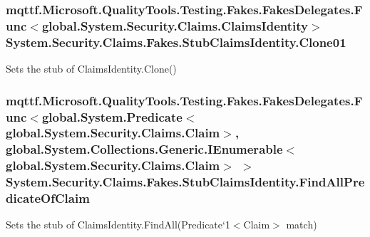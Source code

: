 \hypertarget{class_system_1_1_security_1_1_claims_1_1_fakes_1_1_stub_claims_identity_a72a889d3f2dfdd1b5397b5fe3dfcedfa}{
\subsubsection[{Clone01}]{\setlength{\rightskip}{0pt plus 5cm}mqttf.\-Microsoft.\-Quality\-Tools.\-Testing.\-Fakes.\-Fakes\-Delegates.\-Func$<$global.\-System.\-Security.\-Claims.\-Claims\-Identity$>$ System.\-Security.\-Claims.\-Fakes.\-Stub\-Claims\-Identity.\-Clone01}}\label{class_system_1_1_security_1_1_claims_1_1_fakes_1_1_stub_claims_identity_a72a889d3f2dfdd1b5397b5fe3dfcedfa}


Sets the stub of Claims\-Identity.\-Clone()

\hypertarget{class_system_1_1_security_1_1_claims_1_1_fakes_1_1_stub_claims_identity_ab6cf8acbab7dde559b86c83d42210d7d}{
\subsubsection[{Find\-All\-Predicate\-Of\-Claim}]{\setlength{\rightskip}{0pt plus 5cm}mqttf.\-Microsoft.\-Quality\-Tools.\-Testing.\-Fakes.\-Fakes\-Delegates.\-Func$<$global.\-System.\-Predicate$<$global.\-System.\-Security.\-Claims.\-Claim$>$, global.\-System.\-Collections.\-Generic.\-I\-Enumerable$<$global.\-System.\-Security.\-Claims.\-Claim$>$ $>$ System.\-Security.\-Claims.\-Fakes.\-Stub\-Claims\-Identity.\-Find\-All\-Predicate\-Of\-Claim}}\label{class_system_1_1_security_1_1_claims_1_1_fakes_1_1_stub_claims_identity_ab6cf8acbab7dde559b86c83d42210d7d}


Sets the stub of Claims\-Identity.\-Find\-All(Predicate`1$<$Claim$>$ match)

